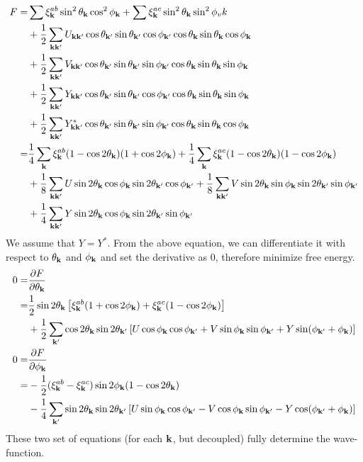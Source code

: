 \begin{equation}
 \begin{split}
  F=&\sum\xi^{ab}_\vk\sin^2{\theta_\vk}\cos^2\phi_\vk+\sum\xi^{ac}_\vk\sin^2{\theta_\vk}\sin^2\phi_vk\\
    &+\nth2\sum_{\vk\vk'}U_{\vk\vk'}\cos\theta_{\vk'}\sin\theta_{\vk'}\cos\phi_{\vk'}\cos\theta_\vk{}\sin\theta_\vk\cos\phi_\vk\\
    &+\nth2\sum_{\vk\vk'}V_{\vk\vk'}\cos\theta_{\vk'}\sin\theta_{\vk'}\sin\phi_{\vk'}\cos\theta_\vk{}\sin\theta_\vk\sin\phi_\vk\\
    &+\nth2\sum_{\vk\vk'}Y_{\vk\vk'}\cos\theta_{\vk'}\sin\theta_{\vk'}\cos\phi_{\vk'}\cos\theta_\vk{}\sin\theta_\vk\sin\phi_\vk\\
    &+\nth2\sum_{\vk\vk'}Y^*_{\vk\vk'}\cos\theta_{\vk'}\sin\theta_{\vk'}\sin\phi_{\vk'}\cos\theta_\vk{}\sin\theta_\vk\cos\phi_\vk\\
    =&\nth4\sum_\vk\xi^{ab}_\vk(1-\cos2\theta_\vk)(1+\cos2\phi_\vk)+\nth4\sum_\vk\xi^{ac}_\vk(1-\cos2\theta_\vk)(1-\cos2\phi_\vk)\\
    &+\nth{8}\sum_{\vk\vk'}U\sin2\theta_\vk\cos\phi_\vk\sin2\theta_{\vk'}\cos\phi_{\vk'}+\nth{8}\sum_{\vk\vk'}V\sin2\theta_\vk\sin\phi_\vk\sin2\theta_{\vk'}\sin\phi_{\vk'}    \\
    &+\nth{4}\sum_{\vk\vk'}Y\sin2\theta_\vk\cos\phi_\vk\sin2\theta_{\vk'}\sin\phi_{\vk'}    
 \end{split}
\end{equation}
We assume that $Y=Y^*$. From the above equation, we can differentiate it with respect to $\theta_\vk$ and $\phi_\vk$ and set the derivative as 0, therefore minimize free energy. 
\begin{align}
0=&\pdiff{F}{\theta_\vk}\notag\\
 =&\nth{2}\sin2\theta_\vk\mbr{\xi^{ab}_\vk(1+\cos2\phi_\vk)+\xi^{ac}_\vk(1-\cos2\phi_\vk)}\notag\\
 &+\nth2\sum_{\vk'}\cos2\theta_\vk\sin2\theta_{\vk'}\mbr{U\cos\phi_\vk\cos\phi_{\vk'}+V\sin\phi_\vk\sin\phi_{\vk'}+Y\sin(\phi_{\vk'}+\phi_\vk)}\\
 0=&\pdiff{F}{\phi_\vk}\notag\\
 =&-\nth{2}(\xi^{ab}_\vk-\xi^{ac}_\vk)\sin2\phi_\vk(1-\cos2\theta_\vk)\notag\\
 &-\nth4\sum_{\vk'}\sin2\theta_\vk\sin2\theta_{\vk'}\mbr{U\sin\phi_\vk\cos\phi_{\vk'}-V\cos\phi_\vk\sin\phi_{\vk'}-Y\cos(\phi_{\vk'}+\phi_\vk)}
\end{align}
  These two set of equations (for each $\vk$, but decoupled) fully determine the wave-function. 
